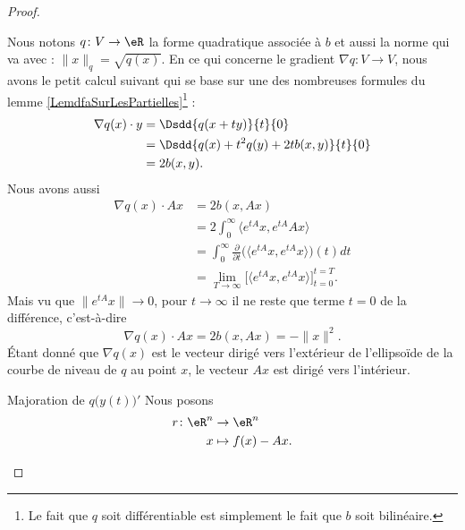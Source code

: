 \begin{proof}
\begin{subproof}
    Nous notons \( q\colon V\to \eR\) la forme quadratique associée à \( b\) et aussi la norme qui va avec : \( \| x \|_q=\sqrt{q(x)}\). En ce qui concerne le gradient \( \nabla q\colon V\to V\), nous avons le petit calcul suivant\cite{MJEooXxBFFY} qui se base sur une des nombreuses formules du lemme \ref{LemdfaSurLesPartielles}\footnote{Le fait que \( q\) soit différentiable est simplement le fait que \( b\) soit bilinéaire.} :
    \begin{subequations}
        \begin{align}
            \nabla q(x)\cdot y&=\Dsdd{ q(x+ty) }{t}{0}\\
            &=\Dsdd{ q(x)+t^2q(y)+2tb(x,y) }{t}{0}\\
            &=2b(x,y).
        \end{align}
    \end{subequations}
    Nous avons aussi
    \begin{subequations}
        \begin{align}
            \nabla q(x)\cdot Ax&=2b(x,Ax)\\
            &=2\int_0^{\infty}\langle  e^{tA}x,  e^{tA}Ax\rangle \\
            &=\int_0^{\infty}\frac{ \partial  }{ \partial t }\Big( \langle  e^{tA}x,  e^{tA}x\rangle  \Big)(t)dt\\
            &=\lim_{T\to \infty} \Big[ \langle  e^{tA}x,  e^{tA}x\rangle  \Big]_{t=0}^{t=T}.
        \end{align}
    \end{subequations}
    Mais vu que \( \|  e^{tA}x \|\to 0\), pour \( t\to \infty\) il ne reste que terme \( t=0\) de la différence, c'est-à-dire
    \begin{equation}    \label{EqUCOGooEFxZSO}
        \nabla q(x)\cdot Ax=2b(x,Ax)=-\| x \|^2.
    \end{equation}
    Étant donné que \( \nabla q(x)\) est le vecteur dirigé vers l'extérieur de l'ellipsoïde de la courbe de niveau de \( q\) au point \( x\), le vecteur \( Ax\) est dirigé vers l'intérieur.

\begin{center}
   
\end{center}

\item[Majoration de \(  q\big( y(t) \big)'  \)]
    Nous posons
    \begin{equation}
        \begin{aligned}
            r\colon \eR^n&\to \eR^n \\
            x&\mapsto f(x)-Ax.
        \end{aligned}
    \end{equation}


\end{subproof}
\end{proof}
